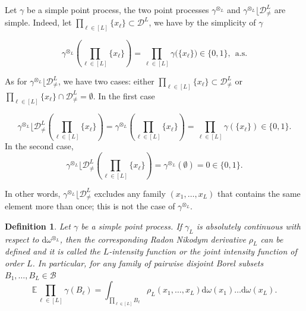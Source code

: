 \documentclass[twoside,11pt]{book}
\newtheorem{definition}{Definition}
\numberwithin{theorem}{chapter}
\numberwithin{definition}{chapter}
\numberwithin{proposition}{chapter}
\numberwithin{corollary}{chapter}
\numberwithin{example}{chapter}
\numberwithin{lemma}{chapter}
\numberwithin{assumption}{chapter}
\numberwithin{equation}{chapter}
\numberwithin{figure}{chapter}
\begin{document}
Let $\gamma$ be a simple point process, the two point processes $\gamma^{\otimes_{L}}$ and $\gamma^{\otimes_{L}} \lfloor \mathcal{D}_{\neq}^{L}$ are simple. Indeed, let $\prod\limits_{\ell \in [L]} \{x_{\ell} \} \subset \mathcal{D}^{L}$, we have by the simplicity of $\gamma$

\begin{equation}
\gamma^{\otimes_{L}} (\prod\limits_{\ell \in [L]} \{x_{\ell } \}) = \prod\limits_{\ell \in [L]} \gamma\big(\{x_{\ell } \} \big) \in \{0,1\} , \:\: \text{a.s.}
\end{equation}

As for $\gamma^{\otimes_{L}} \lfloor \mathcal{D}_{\neq}^{L}$, we have two cases: either $\prod\limits_{\ell \in [L]} \{x_{\ell} \} \subset \mathcal{D}_{\neq}^{L}$ or $\prod\limits_{\ell \in [L]} \{x_{\ell} \} \cap \mathcal{D}_{\neq}^{L} = \emptyset$. In the first case

\begin{equation}
\gamma^{\otimes_{L}} \lfloor \mathcal{D}_{\neq}^{L}(\prod\limits_{\ell \in [L]} \{x_{\ell } \}) = \gamma^{\otimes_{L}} (\prod\limits_{\ell \in [L]} \{x_{\ell } \}) = \prod\limits_{\ell \in [L]} \gamma(\{x_\ell \}) \in \{ 0,1\}.
\end{equation}
In the second case, 
\begin{equation}
\gamma^{\otimes_{L}} \lfloor \mathcal{D}_{\neq}^{L}(\prod\limits_{\ell \in [L]} \{x_{\ell } \}) = \gamma^{\otimes_{L}} (\emptyset) = 0 \in \{ 0,1\}.
\end{equation}


In other words, $\gamma^{\otimes_{L}} \lfloor \mathcal{D}_{\neq}^{L}$ excludes any family $(x_{1}, \dots, x_{L})$ that contains the same element more than once; this is not the case of $\gamma^{\otimes_{L}}$.





\begin{definition}
Let $\gamma$ be a simple point process.
If $\gamma_{L}$ is absolutely continuous with respect to $\mathrm{d}\omega^{\otimes_L}$, then the corresponding Radon Nikodym derivative $\rho_{L}$ can be defined and it is called the $L$-intensity function or the joint intensity function of order $L$. In particular, for any family of pairwise disjoint Borel subsets $B_{1}, \dots, B_{L} \in \mathcal{B}$
\begin{equation}\label{eq:pointprocess_intensity_L}
\mathbb{E} \prod\limits_{\ell \in [L]} \gamma(B_{\ell}) = \int_{\prod\limits_{\ell \in [L]}B_{\ell}} \rho_{L}(x_{1}, \dots, x_{L}) \mathrm{d}\omega(x_{1}) \dots \mathrm{d}\omega(x_{L}).
\end{equation}
 \end{definition}
\end{document}
